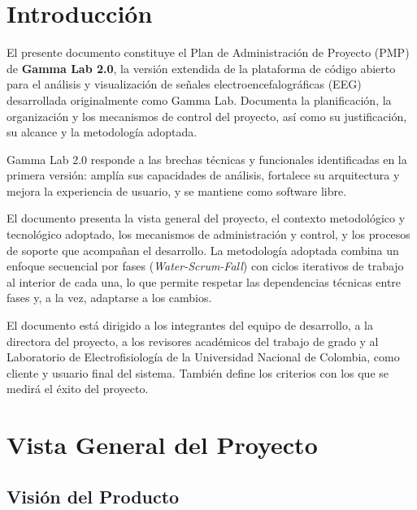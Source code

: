 \documentclass{article}
\begin{document}
\newpage


\tableofcontents


\newpage


\section{Introducción}

El presente documento constituye el Plan de Administración de Proyecto (PMP) de \textbf{Gamma Lab 2.0}, la versión extendida de la plataforma de código abierto para el análisis y visualización de señales electroencefalográficas (EEG) desarrollada originalmente como Gamma Lab. Documenta la planificación, la organización y los mecanismos de control del proyecto, así como su justificación, su alcance y la metodología adoptada.

Gamma Lab 2.0 responde a las brechas técnicas y funcionales identificadas en la primera versión: amplía sus capacidades de análisis, fortalece su arquitectura y mejora la experiencia de usuario, y se mantiene como software libre.

El documento presenta la vista general del proyecto, el contexto metodológico y tecnológico adoptado, los mecanismos de administración y control, y los procesos de soporte que acompañan el desarrollo. La metodología adoptada combina un enfoque secuencial por fases (\textit{Water-Scrum-Fall}) con ciclos iterativos de trabajo al interior de cada una, lo que permite respetar las dependencias técnicas entre fases y, a la vez, adaptarse a los cambios.

El documento está dirigido a los integrantes del equipo de desarrollo, a la directora del proyecto, a los revisores académicos del trabajo de grado y al Laboratorio de Electrofisiología de la Universidad Nacional de Colombia, como cliente y usuario final del sistema. También define los criterios con los que se medirá el éxito del proyecto.

\section{Vista General del Proyecto}
 
\subsection{Visión del Producto}
 
\end{document}
